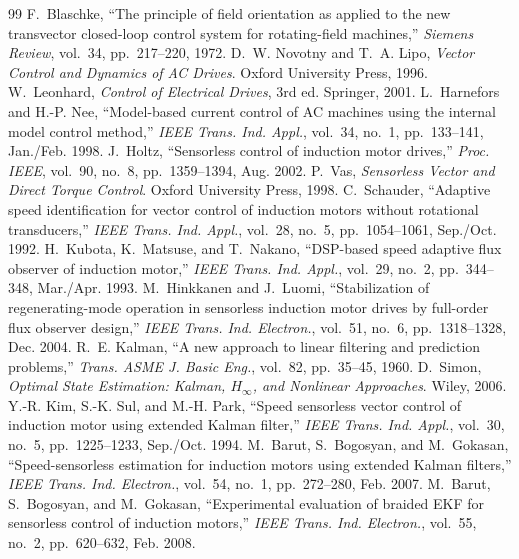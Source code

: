 \documentclass[10pt,a4paper]{scrartcl}
\begin{document}
\begin{thebibliography}{99}
\small
{} F.~Blaschke, ``The principle of field orientation as applied to the new transvector closed-loop control system for rotating-field machines,'' \emph{Siemens Review}, vol.~34, pp.~217--220, 1972.
 D.~W. Novotny and T.~A. Lipo, \emph{Vector Control and Dynamics of AC Drives}. Oxford University Press, 1996.
 W.~Leonhard, \emph{Control of Electrical Drives}, 3rd ed. Springer, 2001.
 L.~Harnefors and H.-P. Nee, ``Model-based current control of AC machines using the internal model control method,'' \emph{IEEE Trans. Ind. Appl.}, vol.~34, no.~1, pp.~133--141, Jan./Feb. 1998.
 J.~Holtz, ``Sensorless control of induction motor drives,'' \emph{Proc. IEEE}, vol.~90, no.~8, pp.~1359--1394, Aug. 2002.
 P.~Vas, \emph{Sensorless Vector and Direct Torque Control}. Oxford University Press, 1998.
 C.~Schauder, ``Adaptive speed identification for vector control of induction motors without rotational transducers,'' \emph{IEEE Trans. Ind. Appl.}, vol.~28, no.~5, pp.~1054--1061, Sep./Oct. 1992.
 H.~Kubota, K.~Matsuse, and T.~Nakano, ``DSP-based speed adaptive flux observer of induction motor,'' \emph{IEEE Trans. Ind. Appl.}, vol.~29, no.~2, pp.~344--348, Mar./Apr. 1993.
 M.~Hinkkanen and J.~Luomi, ``Stabilization of regenerating-mode operation in sensorless induction motor drives by full-order flux observer design,'' \emph{IEEE Trans. Ind. Electron.}, vol.~51, no.~6, pp.~1318--1328, Dec. 2004.
 R.~E. Kalman, ``A new approach to linear filtering and prediction problems,'' \emph{Trans. ASME J. Basic Eng.}, vol.~82, pp.~35--45, 1960.
 D.~Simon, \emph{Optimal State Estimation: Kalman, $H_\infty$, and Nonlinear Approaches}. Wiley, 2006.
 Y.-R. Kim, S.-K. Sul, and M.-H. Park, ``Speed sensorless vector control of induction motor using extended Kalman filter,'' \emph{IEEE Trans. Ind. Appl.}, vol.~30, no.~5, pp.~1225--1233, Sep./Oct. 1994.
 M.~Barut, S.~Bogosyan, and M.~Gokasan, ``Speed-sensorless estimation for induction motors using extended Kalman filters,'' \emph{IEEE Trans. Ind. Electron.}, vol.~54, no.~1, pp.~272--280, Feb. 2007.
 M.~Barut, S.~Bogosyan, and M.~Gokasan, ``Experimental evaluation of braided EKF for sensorless control of induction motors,'' \emph{IEEE Trans. Ind. Electron.}, vol.~55, no.~2, pp.~620--632, Feb. 2008.

\end{thebibliography}
\end{document}
